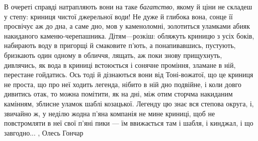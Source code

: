 В очереті справді натрапляють вони на таке \emph{багатство}, якому й ціни не складеш у
степу: криниця чистої джерельної води! Не дуже й глибока вона, сонце її
просвічує аж до дна, а саме дно, мов у каменоломні, золотиться уламками абияк
накиданого каменю-черепашника. Дітям—розкіш: обляжуть криницю з усіх боків,
набирають воду в пригорщі й смаковите п'ють, а понапивавшись, пустують,
бризкають один одному в обличчя, лящать, аж поки знову прищухнуть, дивлячись,
як вода в криниці встоюється і сонячне проміння, зламане в ній, перестане
гойдатись. Ось тоді й дізнаються вони від Тоні-вожатої, що це криниця не
проста, що про неї ходить легенда, нібито в ній дно подвійне, і коли довго
дивитись отак, то можна помітити, як на дні, між отим сторчма накиданим
камінням, зблисне уламок шаблі козацької. Легенду цю знає вся степова округа,
і, звичайно ж, у неділю жодна п'яна компанія не мине криниці, щоб не
повстромляти в неї свої п'яні пики — їм ввижається там і шабля, і кинджал, і що
завгодно...
, Олесь Гончар

